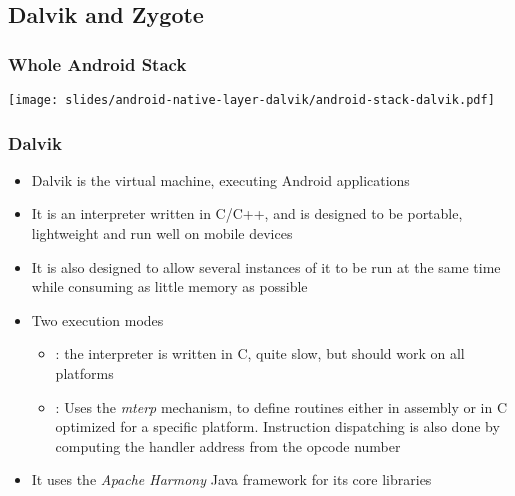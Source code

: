 \subsection{Dalvik and Zygote}

\begin{frame}
  \frametitle{Whole Android Stack}
  \begin{center}
    \texttt{[image: slides/android-native-layer-dalvik/android-stack-dalvik.pdf]}
  \end{center}
\end{frame}

\begin{frame}
  \frametitle{Dalvik}
  \begin{itemize}
  \item Dalvik is the virtual machine, executing Android applications
  \item It is an interpreter written in C/C++, and is designed to be portable,
    lightweight and run well on mobile devices
  \item It is also designed to allow several instances of it to be run
    at the same time while consuming as little memory as possible
  \item Two execution modes
    \begin{itemize}
    \item {}: the interpreter is written in C, quite
      slow, but should work on all platforms
    \item {}: Uses the \emph{mterp} mechanism, to define
      routines either in assembly or in C optimized for a specific
      platform. Instruction dispatching is also done by computing the
      handler address from the opcode number
    \end{itemize}
  \item It uses the \emph{Apache Harmony} Java framework for its core
    libraries
  \end{itemize}
\end{frame}

